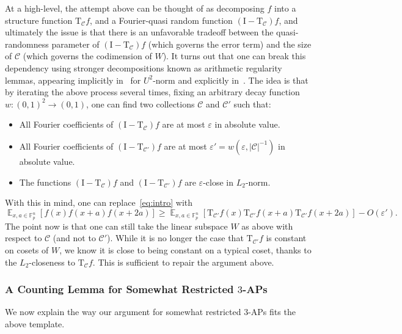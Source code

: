 \documentclass[10pt,a4paper]{amsart}
\newcommand\card[1]{\left| {#1} \right|}
\newcommand\Expect[2]{{\mathop{\mathbb{E}}_{#1}\left[ {#2} \right]}}
\newcommand\eps{\varepsilon}
\renewcommand\geq{\geqslant}
\begin{document}
At a high-level, the attempt above can be thought of as decomposing $f$ into a structure function $\mathrm{T}_{\mathcal{C}} f$, and a Fourier-quasi random function 
$(\mathrm{I}-\mathrm{T}_{\mathcal{C}}) f$, and ultimately the issue is that there is an unfavorable tradeoff between the quasi-randomness parameter of $(\mathrm{I}-\mathrm{T}_{\mathcal{C}}) f$ (which governs the error term) and the size of $\mathcal{C}$ (which governs the codimension of $W$). It turns out that one can break this dependency using stronger decompositions known as arithmetic regularity lemmas, appearing implicitly in~\cite{bourgain1986szemeredi} for $U^2$-norm and explicitly in~\cite{Green2005SzemerediRegularityAbelianGroups,GreenTao2010ArithmeticRegularity}. The idea is that by iterating the above process several times, fixing an arbitrary decay function $w\colon (0,1)^2\to (0,1)$, one can find two collections $\mathcal{C}$ and $\mathcal{C}'$ such that:
\begin{itemize}
    \item All Fourier coefficients of 
    $(\mathrm{I}-\mathrm{T}_{\mathcal{C}}) f$ are at most $\eps$ in absolute value.
    \item All Fourier coefficients of $(\mathrm{I}-\mathrm{T}_{\mathcal{C}'}) f$ are at most $\eps'=w(\eps,\card{\mathcal{C}}^{-1})$ in absolute value.
    \item The functions 
    $(\mathrm{I}-\mathrm{T}_{\mathcal{C}}) f$ and 
    $(\mathrm{I}-\mathrm{T}_{\mathcal{C}'}) f$ are $\eps$-close in $L_2$-norm.
\end{itemize}
With this in mind, one can replace~\eqref{eq:intro} with 
\begin{equation}\label{eq:intro_2}
\Expect{x,a\in\mathbb{F}_p^n}{f(x)f(x+a)f(x+2a)}
\geq
\Expect{x,a\in\mathbb{F}_p^n}{\mathrm{T}_{\mathcal{C}'}f(x)\mathrm{T}_{\mathcal{C}'}f(x+a)\mathrm{T}_{\mathcal{C}'}f(x+2a)}
-O(\eps').
\end{equation}
The point now is that one can still take the linear subspace $W$ as above with respect to $\mathcal{C}$ (and not to $\mathcal{C}'$). While it is no longer the case that $\mathrm{T}_{\mathcal{C}'}f$ is constant on cosets of $W$, we know it is close to being constant on a typical coset, thanks to the $L_2$-closeness to  $\mathrm{T}_{\mathcal{C}}f$. This is sufficient to repair the argument above.

\subsubsection{A Counting Lemma for Somewhat Restricted \texorpdfstring{$3$}{3}-APs}
We now explain the way our argument for somewhat restricted $3$-APs fits the above template. 
\end{document}
